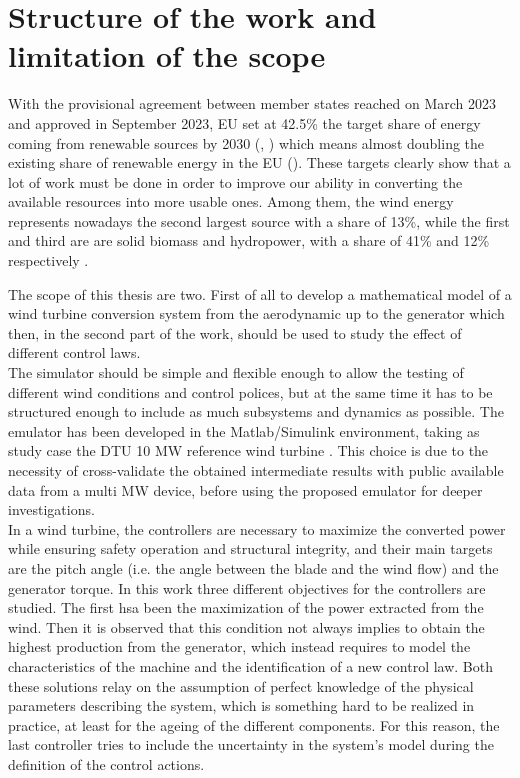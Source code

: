 \newpage
\section{Structure of the work and limitation of the scope}\label{sec:b_introduction}
With the provisional agreement between member states reached on March 2023 and approved in September 2023, EU set at 42.5\% the target share of energy coming from renewable sources by 2030 (\cite{rauters}, \cite{EU_targets}) which means almost doubling the existing share of renewable energy in the EU (\cite{EU_targets}). These targets clearly show that a lot of work must be done in order to improve our ability in converting the available resources into more usable ones. Among them, the wind energy represents nowadays the second largest source with a share of 13\%, while the first and third are are solid biomass and hydropower, with a share of 41\% and 12\% respectively \cite{ren_share}. 

The scope of this thesis are two. First of all to develop a mathematical model of a wind turbine conversion system from the aerodynamic up to the generator which then, in the second part of the work, should be used to study the effect of different control laws. \\
The simulator should be simple and flexible enough to allow the testing of different wind conditions and control polices, but at the same time it has to be structured enough to include as much subsystems and dynamics as possible. The emulator has been developed in the Matlab/Simulink environment, taking as study case the DTU 10 MW reference wind turbine \cite{DTU_Wind_Energy_Report-I-0092}. This choice is due to the necessity of cross-validate the obtained intermediate results with public available data from a multi MW device, before using the proposed emulator for deeper investigations.\\
In a wind turbine, the controllers are necessary to maximize the converted power while ensuring safety operation and structural integrity, and their main targets are the pitch angle (i.e. the angle between the blade and the wind flow) and the generator torque. In this work three different objectives for the controllers are studied. The first hsa been the maximization of the power extracted from the wind. Then it is observed that this condition not always implies to obtain the highest production from the generator, which instead requires to model the characteristics of the machine and the identification of a new control law. Both these solutions relay on the assumption of perfect knowledge of the physical parameters describing the system, which is something hard to be realized in practice, at least for the ageing of the different components. For this reason, the last controller tries to include the uncertainty in the system's model during the definition of the control actions.  \\

